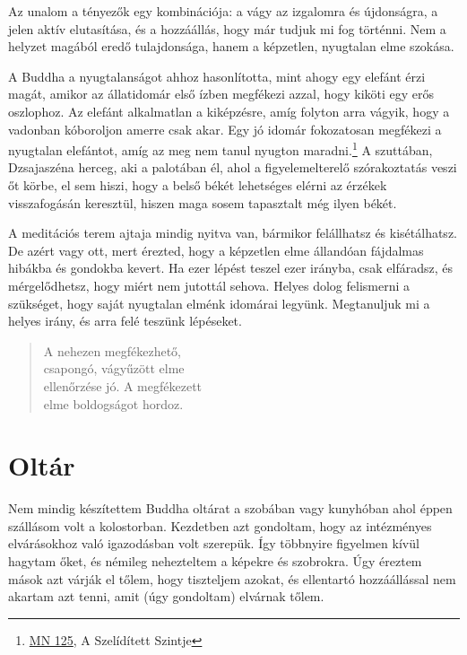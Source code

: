 Az unalom a tényezők egy kombinációja: a vágy az izgalomra és
újdonságra, a jelen aktív elutasítása, és a hozzáállás, hogy már tudjuk
mi fog történni. Nem a helyzet magából eredő tulajdonsága, hanem a
képzetlen, nyugtalan elme szokása.

A Buddha a nyugtalanságot ahhoz hasonlította, mint ahogy egy elefánt
érzi magát, amikor az állatidomár első ízben megfékezi azzal, hogy
kiköti egy erős oszlophoz. Az elefánt alkalmatlan a kiképzésre, amíg
folyton arra vágyik, hogy a vadonban kóboroljon amerre csak akar. Egy jó
idomár fokozatosan megfékezi a nyugtalan elefántot, amíg az meg nem
tanul nyugton maradni.\footnote{\href{https://suttacentral.net/mn125}{MN
  125}, A Szelídített Szintje} A szuttában, Dzsajaszéna herceg, aki a
palotában él, ahol a figyelemelterelő szórakoztatás veszi őt körbe, el
sem hiszi, hogy a belső békét lehetséges elérni az érzékek visszafogásán
keresztül, hiszen maga sosem tapasztalt még ilyen békét.

A meditációs terem ajtaja mindig nyitva van, bármikor felállhatsz és
kisétálhatsz. De azért vagy ott, mert érezted, hogy a képzetlen elme
állandóan fájdalmas hibákba és gondokba kevert. Ha ezer lépést teszel
ezer irányba, csak elfáradsz, és mérgelődhetsz, hogy miért nem jutottál
sehova. Helyes dolog felismerni a szükséget, hogy saját nyugtalan elménk
idomárai legyünk. Megtanuljuk mi a helyes irány, és arra felé teszünk
lépéseket.

\begin{quote}
A nehezen megfékezhető,\\
csapongó, vágyűzött elme\\
ellenőrzése jó. A megfékezett\\
elme boldogságot hordoz.

\bigskip

\end{quote}

\section{Oltár}


\noindent Nem mindig készítettem Buddha oltárat a szobában vagy
kunyhóban ahol éppen szállásom volt a kolostorban. Kezdetben azt
gondoltam, hogy az intézményes elvárásokhoz való igazodásban volt
szerepük. Így többnyire figyelmen kívül hagytam őket, és némileg
nehezteltem a képekre és szobrokra. Úgy éreztem mások azt várják el
tőlem, hogy tiszteljem azokat, és ellentartó hozzáállással nem akartam
azt tenni, amit (úgy gondoltam) elvárnak tőlem.


